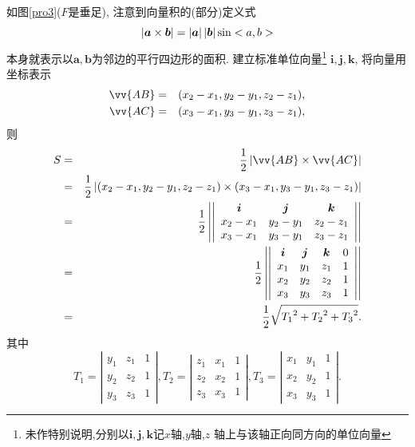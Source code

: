 \sol 如图\ref{pro3}($F$是垂足),
注意到向量积的(部分)定义式
$$\left| {\bm{a}\times\bm{b}} \right|=\left| {\bm{a}} \right|\left| {\bm{b}} \right|\sin<a,b>$$
本身就表示以$\bm{a},\bm{b}$为邻边的平行四边形的面积.
建立标准单位向量\footnote{
  未作特别说明,分别以$\bm{i},\bm{j},\bm{k}$记$x$轴,$y$轴,$z$
  轴上与该轴正向同方向的单位向量
  }
  $\bm{i},\bm{j},\bm{k}$, 将向量用坐标表示
\begin{eqnarray}
\vv{AB}&=&(x_2-x_1,y_2-y_1,z_2-z_1),\nonumber\\
\vv{AC}&=&(x_3-x_1,y_3-y_1,z_3-z_1),\nonumber
\end{eqnarray}
则
\begin{eqnarray}
  S&=&\frac{1}{2}\abs{\vv{AB}\times\vv{AC}}\nonumber\\
  &=&\frac{1}{2}\abs
  {(x_2-x_1,y_2-y_1,z_2-z_1)\times
  (x_3-x_1,y_3-y_1,z_3-z_1)}\nonumber\\
  &=&\frac{1}{2}\left|\left|
  \begin{array}{ccc}
    \bm{i} & \bm{j} & \bm{k} \\
    x_2-x_1 & y_2-y_1  & z_2-z_1 \\
    x_3-x_1 &y_3-y_1  & z_3-z_1 \\
  \end{array}
  \right|\right|\nonumber\\
  &=&\frac{1}{2}\left|\left|
  \begin{array}{cccc}
    \bm{i}&\bm{j}&\bm{k}&0\\
    x_1&y_1&z_1&1\\
    x_2&y_2 &z_2&1\\
    x_3&y_3&z_3&1\\
  \end{array}
  \right|\right|\nonumber\\
  &=&\frac{1}{2}\sqrt
  {
    {T_1}^2+
    {T_2}^2+
    {T_3}^2
  }\nonumber.
\end{eqnarray}
其中
$$
T_1=\left|\begin{array}{ccc}
          y_1&z_1&1\\
          y_2&z_2&1\\
          y_3&z_3&1
          \end{array}\right|,
T_2=\left|\begin{array}{ccc}
  z_1&x_1&1\\
  z_2&x_2&1\\
  z_3&x_3&1
  \end{array}\right|,
T_3=\left|\begin{array}{ccc}
  x_1&y_1&1\\
  x_2&y_2&1\\
  x_3&y_3&1
  \end{array}\right|.
$$
\solend

